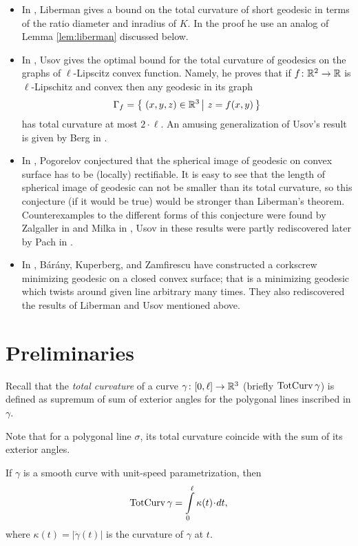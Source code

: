 \documentclass[a4paper,10pt]{amsart}
\begin{document}
\begin{itemize}
\item In \cite{liberman}, Liberman gives a bound on the total curvature of short geodesic in terms of the ratio diameter and inradius of $K$.
In the proof he use an analog of Lemma \ref{lem:liberman} discussed below.

\item In \cite{usov}, 
Usov gives the optimal bound for the total curvature of geodesics on the graphs of $\ell$-Lipscitz convex function. 
Namely, he proves that if $f\colon\mathbb{R}^2\to\mathbb{R}$ is $\ell$-Lipschitz and convex then any 
geodesic in its graph 
\[\Gamma_f=\set{(x,y,z)\in \RR^3}{z=f(x,y)}\] 
has total curvature at most $2\cdot \ell$.
An amusing generalization of Usov's result is given by Berg in \cite{berg}.
\item In \cite{pogorelov}, Pogorelov conjectured %
that the spherical image of geodesic on convex surface has to be (locally) rectifiable.
It is easy to see that the length of spherical image of geodesic can not be smaller than its total curvature, 
so this conjecture (if it would be true) 
would be stronger than Liberman's theorem.
Counterexamples to the different forms of this conjecture were found  by Zalgaller in \cite{zalgaller} and  Milka in \cite{milka}, 
Usov in \cite{usov-conj-pog} 
these results were partly rediscovered later by Pach in \cite{pach}.
\item In \cite{BKZ},
B{\'a}r{\'a}ny,
Kuperberg, 
and Zamfirescu 
have constructed a corkscrew minimizing geodesic on a closed convex surface;
that is a minimizing geodesic which twists around given line arbitrary many times.
They also rediscovered the results of Liberman and Usov mentioned above.
\end{itemize}


\section{Preliminaries}

Recall that the \emph{total curvature} of a curve $\gamma\colon[0,\ell]\to \mathbb{R}^3$ 
(briefly $\mathop{\rm TotCurv}\nolimits\gamma$)
is defined as supremum of sum of exterior angles 
for the polygonal lines inscribed in $\gamma$.

Note that for a polygonal line $\sigma$, 
its total curvature coincide with the sum of its exterior angles.

If $\gamma$ is a smooth curve with unit-speed parametrization, 
then 
\[\tc\gamma=\int\limits_0^\ell \kappa(t)\cdot dt,\]
where $\kappa(t)=|\ddot\gamma(t)|$ is the curvature of $\gamma$ at $t$.
\end{document}
